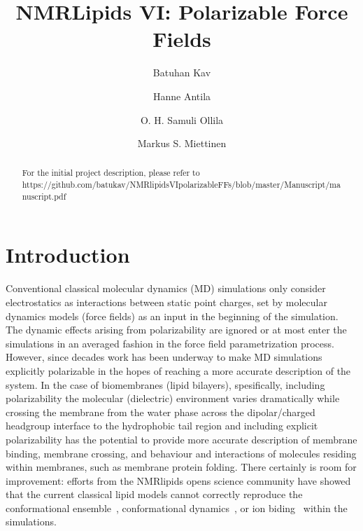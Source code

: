 \documentclass[journal=jacsat,manuscript=article,layout=singlecolumn]{achemso}
\author{Batuhan Kav}
\author{Hanne Antila}
\affiliation{Forschungszentrum Juelich, Germany}
\author{O. H. Samuli Ollila}
\author{Markus S. Miettinen}
\title{NMRLipids VI: Polarizable Force Fields}
\begin{document}


\begin{abstract}
	
	For the initial project description, please refer to \\ https://github.com/batukav/NMRlipidsVIpolarizableFFs/blob/master/Manuscript/manuscript.pdf
	
\end{abstract}

\section{Introduction}
Conventional classical molecular dynamics (MD) simulations only consider electrostatics as interactions between static point charges, set by molecular dynamics models (force fields) as an input in the beginning of the simulation. The dynamic effects arising from polarizability are ignored or at most enter the simulations in an averaged fashion in the force field parametrization process. However, since decades work has been underway to make MD simulations explicitly polarizable in the hopes of reaching a more accurate description of the system. In the case of biomembranes (lipid bilayers), spesifically, including polarizability the molecular (dielectric) environment varies dramatically while crossing the membrane from the water phase across the dipolar/charged headgroup interface to the hydrophobic tail region and including explicit polarizability has the potential to provide more accurate description of membrane binding, membrane crossing, and behaviour and interactions of molecules residing within membranes, such as membrane protein folding. There certainly is room for improvement: efforts from the NMRlipids opens science community have showed that the current classical lipid models cannot correctly reproduce the conformational ensemble~\cite{}, conformational dynamics~\cite{}, or ion biding~\cite{} within the simulations. 
\end{document}
